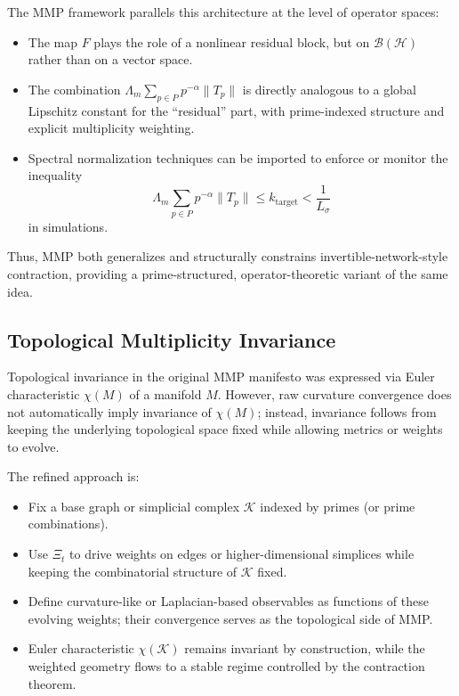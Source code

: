 \documentclass[12pt]{article}
\begin{document}
The MMP framework parallels this architecture at the level of operator spaces:

\begin{itemize}
  \item The map \(F\) plays the role of a nonlinear residual block, but on \(\mathcal{B}(\mathcal{H})\) rather than on a vector space.
  \item The combination \(\Lambda_m \sum_{p\in P} p^{-\alpha}\|T_p\|\) is directly analogous to a global Lipschitz constant for the ``residual'' part, with prime-indexed structure and explicit multiplicity weighting.
  \item Spectral normalization techniques can be imported to enforce or monitor the inequality
  \[
    \Lambda_m \sum_{p\in P} p^{-\alpha}\|T_p\| \le k_{\mathrm{target}} < \frac{1}{L_\sigma}
  \]
  in simulations.
\end{itemize}

Thus, MMP both generalizes and structurally constrains invertible-network-style contraction, providing a prime-structured, operator-theoretic variant of the same idea.

\subsection{Topological Multiplicity Invariance}

Topological invariance in the original MMP manifesto was expressed via Euler characteristic \(\chi(M)\) of a manifold \(M\). However, raw curvature convergence does not automatically imply invariance of \(\chi(M)\); instead, invariance follows from keeping the underlying topological space fixed while allowing metrics or weights to evolve.

The refined approach is:

\begin{itemize}
  \item Fix a base graph or simplicial complex \(\mathcal{K}\) indexed by primes (or prime combinations).
  \item Use \(\Xi_t\) to drive weights on edges or higher-dimensional simplices while keeping the combinatorial structure of \(\mathcal{K}\) fixed.
  \item Define curvature-like or Laplacian-based observables as functions of these evolving weights; their convergence serves as the topological side of MMP.
  \item Euler characteristic \(\chi(\mathcal{K})\) remains invariant by construction, while the weighted geometry flows to a stable regime controlled by the contraction theorem.
\end{itemize}
\end{document}
